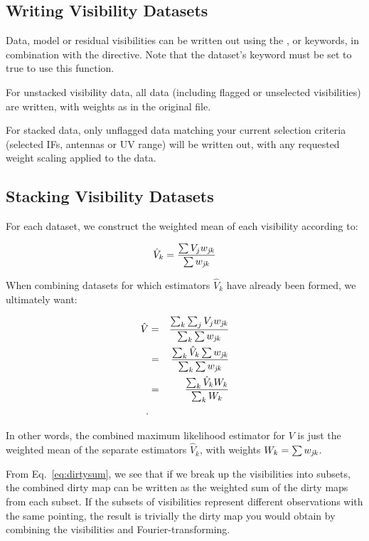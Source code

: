 \subsection{Writing Visibility Datasets}
\label{sec:viswrite}

Data, model or residual visibilities can be written out using the
,  or  keywords, in
combination with the  directive.  Note that the
dataset's  keyword must be set to true to use this
function.

For unstacked visibility data, all data (including flagged or
unselected visibilities) are written, with weights as in the original
file.

For stacked data, only unflagged data matching your current selection
criteria (selected IFs, antennas or UV range) will be written out,
with any requested weight scaling applied to the data.

\subsection{Stacking Visibility Datasets}
\label{sec:stack}

For each dataset, we construct the weighted mean of each visibility according to:

\begin{equation}
\hat{V}_k = {{\sum{V_j w_{{\it jk}}}\over{\sum{w_{{\it jk}}}}}}
\end{equation}

When combining datasets for which estimators $\hat{V}_k$ have already
been formed, we ultimately want:

\begin{eqnarray}\nonumber
\hat{V} &=& {{\sum_k\sum_j{V_j w_{{\it jk}}}\over{\sum_k\sum{w_{{\it jk}}}}}}\\\nonumber
        &=& {{\sum_k\hat{V}_k\sum{w_{{\it jk}}}}\over{\sum_k\sum{w_{{\it jk}}}}}\\\nonumber
        &=& {{\sum_k\hat{V}_k W_k}\over{\sum_k W_k}}\\\nonumber.
\end{eqnarray}

In other words, the combined maximum likelihood estimator for $V$ is
just the weighted mean of the separate estimators $\hat{V}_k$, with
weights $W_k = \sum{w_{{\it jk}}}$.

From Eq.~\ref{eq:dirtysum}, we see that if we break up the
visibilities into subsets, the combined dirty map can be written as
the weighted sum of the dirty maps from each subset.  If the subsets
of visibilities represent different observations with the same
pointing, the result is trivially the dirty map you would obtain by
combining the visibilities and Fourier-transforming.

